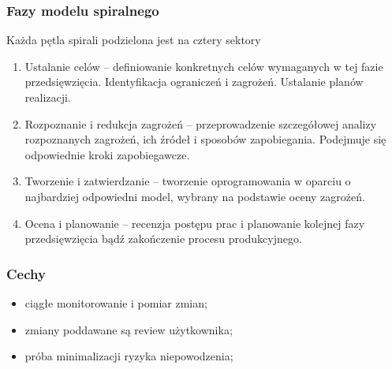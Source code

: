 \documentclass[12pt]{article}
\begin{document}
    \subsubsection{Fazy modelu spiralnego}
    Każda pętla spirali podzielona jest na cztery sektory
    \begin{enumerate}
        \item Ustalanie celów – definiowanie konkretnych celów wymaganych w tej fazie przedsięwzięcia. Identyfikacja ograniczeń i zagrożeń. Ustalanie planów realizacji.
        \item Rozpoznanie i redukcja zagrożeń – przeprowadzenie szczegółowej analizy rozpoznanych zagrożeń, ich źródeł i sposobów zapobiegania. Podejmuje się odpowiednie kroki zapobiegawcze.
        \item Tworzenie i zatwierdzanie – tworzenie oprogramowania w oparciu o najbardziej odpowiedni model, wybrany na podstawie oceny zagrożeń.
        \item Ocena i planowanie – recenzja postępu prac i planowanie kolejnej fazy przedsięwzięcia bądź zakończenie procesu produkcyjnego.
    \end{enumerate}
    
    \subsubsection{Cechy}
    \begin{itemize}
        \item ciągłe monitorowanie i pomiar zmian;
        \item zmiany poddawane są review użytkownika;
        \item próba minimalizacji ryzyka niepowodzenia;
    \end{itemize}
    
\end{document}
